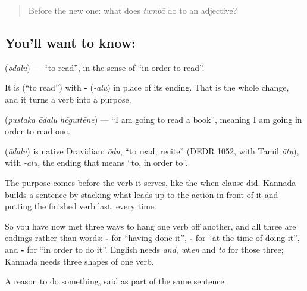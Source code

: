 \label{lesson:KA-C73-in-order-to}



\begin{quote}
Before the new one: what does \emph{tumbā} do to an adjective?
\end{quote}

\subsection*{You'll want to know: }
\textbf{} (\emph{ōdalu}) — \textquotedblleft{}to read\textquotedblright{}, in the sense of \textquotedblleft{}in order to read\textquotedblright{}.

It is  (\textquotedblleft{}to read\textquotedblright{}) with \textbf{-} (\emph{-alu}) in place of its ending. That is the whole change, and it turns a verb into a purpose.

\textbf{  } (\emph{pustaka ōdalu hōguttēne}) — \textquotedblleft{}I am going to read a book\textquotedblright{}, meaning I am going in order to read one.

\begin{cousinweb}
\textbf{} (\emph{ōdalu}) is native Dravidian: \emph{ōdu}, \textquotedblleft{}to read, recite\textquotedblright{} (DEDR 1052, with Tamil \emph{ōtu}), with \emph{-alu}, the ending that means \textquotedblleft{}to, in order to\textquotedblright{}.
\end{cousinweb}

\begin{grammarlens}[title={Grammar Lens: three endings, three ways to join two actions}]
The purpose comes before the verb it serves, like the when-clause did. Kannada builds a sentence by stacking what leads up to the action in front of it and putting the finished verb last, every time.

So you have now met three ways to hang one verb off another, and all three are endings rather than words: \textbf{-} for \textquotedblleft{}having done it\textquotedblright{}, \textbf{-} for \textquotedblleft{}at the time of doing it\textquotedblright{}, and \textbf{-} for \textquotedblleft{}in order to do it\textquotedblright{}. English needs \emph{and}, \emph{when} and \emph{to} for those three; Kannada needs three shapes of one verb.
\end{grammarlens}

\begin{grammarlens}[title={What you've built}]
A reason to do something, said as part of the same sentence.
\end{grammarlens}

